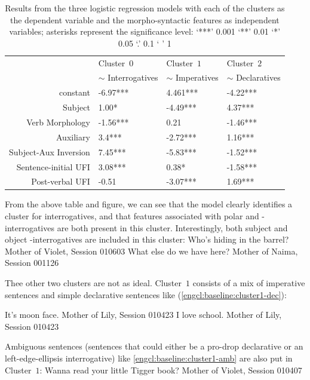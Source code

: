 \begin{table}[H]
\begin{center}
\begin{tabular}{r|l|l|l}
\hline
 & Cluster~$0$   & Cluster~$1$   &  Cluster~$2$ \\
 & $\sim$ Interrogatives  & $\sim$ Imperatives  & $\sim$ Declaratives \\
 \hline\hline
constant & -6.97*** & 4.461*** & -4.22*** \\
\hline
Subject & 1.00* & -4.49*** & 4.37*** \\
\hline
Verb Morphology & -1.56*** & 0.21  & -1.46*** \\
\hline
Auxiliary & 3.4***  & -2.72*** & 1.16*** \\
\hline
Subject-Aux Inversion & 7.45*** & -5.83*** & -1.52*** \\
\hline
Sentence-initial UFI & 3.08*** & 0.38* & -1.58*** \\
\hline
Post-verbal UFI & -0.51  & -3.07***  & 1.69*** \\
\hline \hline
\end{tabular}
\end{center}
\caption{Results from the three logistic regression models with each of the clusters as the dependent variable and the morpho-syntactic features as independent variables; asterisks represent the significance level: ‘***’ 0.001 ‘**’ 0.01 ‘*’ 0.05 ‘.’ 0.1 ‘ ’ 1}
\label{tab:baseline-synstats}
\end{table}%


From the above table and figure, we can see that the model clearly identifies a cluster for interrogatives, and that features associated with polar and \twh-interrogatives are both present in this cluster. Interestingly, both subject and object \twh-interrogatives are included in this cluster:
Who's hiding in the barrel? \hfill Mother of Violet, Session 010603
\ex What else do we have here? \hfill Mother of Naima, Session 001126
\eex

Thee other two clusters are not as ideal. Cluster~$1$ consists of a mix of imperative sentences and simple declarative sentences like (\ref{engcl:baseline:cluster1-dec}):

It's moon face. \hfill Mother of Lily, Session 010423
\ex I love school. \hfill Mother of Lily, Session 010423
\eex

Ambiguous sentences (sentences that could either be a pro-drop declarative or an left-edge-ellipsis interrogative) like \ref{engcl:baseline:cluster1-amb} are also put in Cluster~$1$:
Wanna read your little Tigger book? \hfill Mother of Violet, Session 010407
\eex


